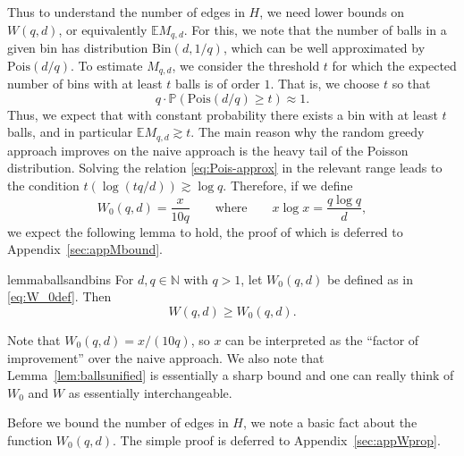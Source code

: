 \documentclass[12pt,reqno]{amsart}
\theoremstyle{remark}
\numberwithin{theorem}{section}
\renewcommand{\(}{\bigl(}
\renewcommand{\)}{\bigr)\vphantom{)}}
\renewcommand{\geq}{\ge}
\renewcommand{\ge}{\geqslant}
\newcommand{\NN}{\mathbb{N}}
\begin{document}
Thus to understand the number of edges in $H$, we need lower bounds on $W(q,d)$, or equivalently $\mathbb{E} M_{q,d}$. For this, we note that the number of balls in a given bin has distribution $\mathrm{Bin}(d,1/q)$, which can be well approximated by $\mathrm{Pois}(d/q)$. To estimate $M_{q,d}$, we consider the threshold $t$ for which the expected number of bins with at least $t$ balls is of order $1$. That is, we choose $t$ so that
\begin{equation}\label{eq:Pois-approx}
q \cdot \mathbb{P}(\mathrm{Pois}(d/q) \ge t) \approx 1.
\end{equation}
Thus, we expect that with constant probability there exists a bin with at least $t$ balls, and in particular $\mathbb{E} M_{q,d} \gtrsim t$. The main reason why the random greedy approach improves on the naive approach is the heavy tail of the Poisson distribution. Solving the relation \eqref{eq:Pois-approx} in the relevant range leads to the condition
$t(\log (tq/d))\gtrsim \log q$. Therefore, if we define
\begin{equation}\label{eq:W_0def}
    W_0(q, d)=\frac{x}{10q} \qquad \text{where} \qquad x\log x= \frac{q \log q}{d},
\end{equation}
we expect the following lemma to hold, the proof of which is deferred to Appendix~\ref{sec:appMbound}.

\begin{restatable}{lemma}{ballsandbins}\label{lem:ballsunified}
    For $d,q \in \NN$ with $q >1$, let $W_0(q,d)$ be defined as in \eqref{eq:W_0def}. Then \[W(q,d)\geq W_0(q,d).\]
\end{restatable}
Note that $W_0(q, d)=x/(10q)$, so $x$ can be interpreted as the ``factor of improvement'' over the naive approach. We also note that Lemma~\ref{lem:ballsunified} is essentially a sharp bound and one can really think of $W_0$ and $W$ as essentially interchangeable.

 Before we bound the number of edges in $H$, we note a basic fact about the function $W_0(q,d)$. The simple proof is deferred to Appendix~\ref{sec:appWprop}.
\end{document}
